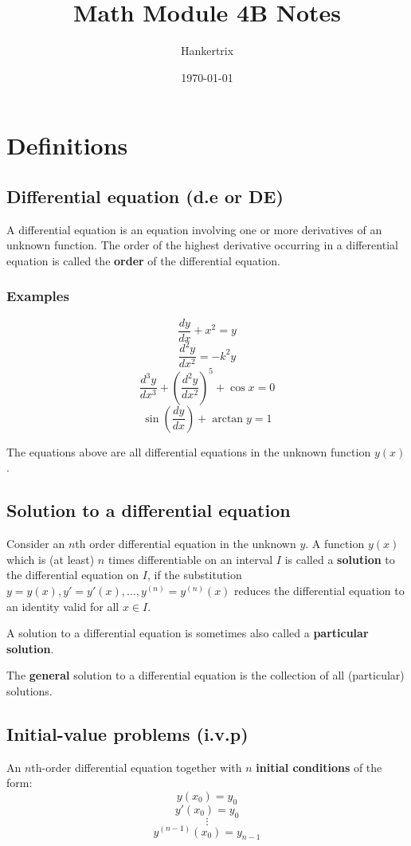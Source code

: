 \documentclass[11pt]{article}
\author{Hankertrix}
\date{\today}
\title{Math Module 4B Notes}
\begin{document}
\maketitle
\setcounter{tocdepth}{2}
\tableofcontents \clearpage\section{Definitions}
\label{sec:orgbf52b5f}

\subsection{Differential equation (d.e or DE)}
\label{sec:org0aa2e59}
A differential equation is an equation involving one or more derivatives of an unknown function. The order of the highest derivative occurring in a differential equation is called the \textbf{order} of the differential equation.
\subsubsection{Examples}
\label{sec:orgf18f6a5}
\[\frac{dy}{dx} + x^2 = y\]
\[\frac{d^2y}{dx^2} = -k^2 y\]
\[\frac{d^3y}{dx^3} + \left( \frac{d^2y}{dx^2} \right)^5 + \cos x = 0\]
\[\sin \left( \frac{dy}{dx} \right) + \arctan y = 1\]

The equations above are all differential equations in the unknown function \(y(x)\).
\subsection{Solution to a differential equation}
\label{sec:orge0fa9d4}
Consider an \(n\)th order differential equation in the unknown \(y\). A function \(y(x)\) which is (at least) \(n\) times differentiable on an interval \(I\) is called a \textbf{solution} to the differential equation on \(I\), if the substitution \(y = y(x), y' = y'(x), \ldots, y^{(n)} = y^{(n)}(x)\) reduces the differential equation to an identity valid for all \(x \in I\).


A solution to a differential equation is sometimes also called a \textbf{particular solution}.


The \textbf{general} solution to a differential equation is the collection of all (particular) solutions.

\newpage
\subsection{Initial-value problems (i.v.p)}
\label{sec:org6c8f988}
An \(n\)th-order differential equation together with \(n\) \textbf{initial conditions} of the form:
\[y(x_0) = y_0\]
\[y'(x_0) = y_0\]
\[\vdots\]
\[y^{(n - 1)}(x_0) = y_{n - 1}\]
\end{document}
